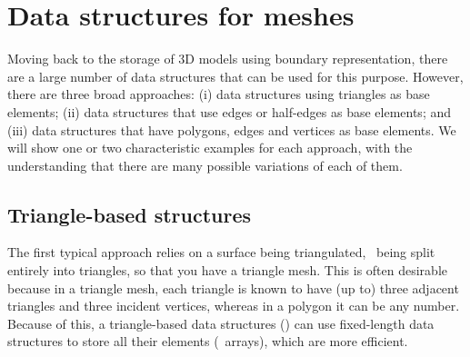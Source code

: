 \section{Data structures for meshes}

Moving back to the storage of 3D models using boundary representation, there are a large number of data structures that can be used for this purpose.
However, there are three broad approaches: (i) data structures using triangles as base elements; (ii) data structures that use edges or half-edges as base elements; and (iii) data structures that have polygons, edges and vertices as base elements.
We will show one or two characteristic examples for each approach, with the understanding that there are many possible variations of each of them.

\subsection{Triangle-based structures}

The first typical approach relies on a surface being triangulated, \ie\ being split entirely into triangles, so that you have a triangle mesh.
This is often desirable because in a triangle mesh, each triangle is known to have (up to) three adjacent triangles and three incident vertices, whereas in a polygon it can be any number.
Because of this, a triangle-based data structures () can use fixed-length data structures to store all their elements (\eg\ arrays), which are more efficient.

